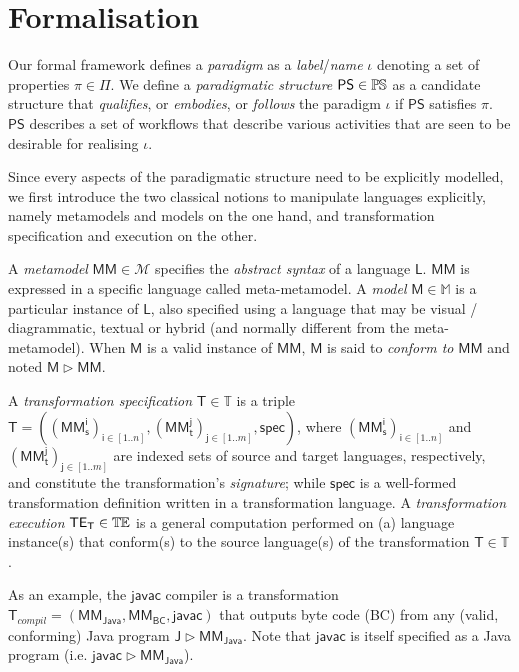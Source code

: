 \section{Formalisation}
\label{sec:Formalisation}

Our formal framework defines a \emph{paradigm} as a \emph{label}/\emph{name} 
$\iota$ denoting a set of properties $\pi\in\Pi$. We define a 
\emph{paradigmatic structure} $\mathsf{PS}\in \mathbb{P}\mskip-1mu\mathbb{S}$ as a candidate structure that 
\emph{qualifies}, or \emph{embodies}, or \emph{follows} the paradigm $\iota$ if 
$\mathsf{PS}$ satisfies $\pi$. $\mathsf{PS}$ describes a set of workflows that 
describe various activities that are seen to be desirable for realising 
$\iota$. 

Since every aspects of the paradigmatic structure need to be explicitly 
modelled, we first introduce the two classical notions to manipulate languages 
explicitly, namely metamodels and models on the one hand, and transformation 
specification and execution on the other. 

A \emph{metamodel} $\mathsf{MM} \in \mathcal{M}$ specifies the \emph{abstract 
syntax} of a language $\mathsf{L}$. $\mathsf{MM}$ is expressed in a specific 
language called meta-metamodel. 
A \emph{model} $\mathsf{M} \in \mathbb{M}$ is a particular instance of 
$\mathsf{L}$, also specified using a language that may be visual / 
diagrammatic, textual or hybrid (and normally different from the 
meta-metamodel). When $\mathsf{M}$ is a valid instance of 
$\mathsf{MM}$, $\mathsf{M}$ is said to \emph{conform to} $\mathsf{MM}$ and noted 
$\mathsf{M} \rhd \mathsf{MM}$. 

A \emph{transformation specification} $\mathsf{T}\in\mathbb{T}$ is a triple 
$\mathsf{T} = ((\mathsf{MM_s^{i}})_{\mathsf{i}\in [1..n]}, 
(\mathsf{MM_t^{j}})_{\mathsf{j}\in[1..m]}, \mathsf{spec})$, where  
$(\mathsf{MM_s^{i}})_{\mathsf{i}\in [1..n]}$ and
$(\mathsf{MM_t^{j}})_{\mathsf{j}\in [1..m]}$ are indexed sets of source and
target languages, respectively, and constitute the transformation's 
\emph{signature}; while $\mathsf{spec}$ is a well-formed 
transformation definition written in a transformation language. A 
\emph{transformation execution} $\mathsf{TE_{T}}\in\mathbb{T}\mskip-1mu\mathbb{E}$ is a general 
computation performed on (a) language instance(s) that conform(s) to the 
source language(s) of the transformation $\mathsf{T}\in\mathbb{T}$.

As an example, the $\mathsf{javac}$ compiler is a transformation 
$\mathsf{T}_{compil} = (\mathsf{MM_{Java}}, \mathsf{MM_{BC}}, \mathsf{javac})$
that outputs byte code (BC) from any (valid, conforming) Java program 
$\mathsf{J}  \rhd \mathsf{MM_{Java}}$. Note that $\mathsf{javac}$ is itself 
specified as a Java program (i.e. $\mathsf{javac} \rhd \mathsf{MM_{Java}}$).

